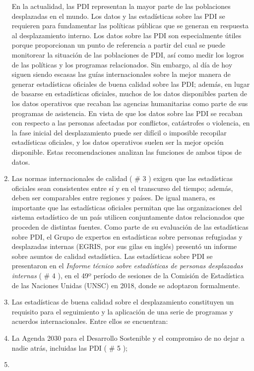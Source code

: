\documentclass[
]{book}
\begin{document}
\begin{enumerate}
  En la actualidad, las PDI representan la mayor parte de las poblaciones desplazadas en el mundo. Los datos y las estadísticas sobre las PDI se requieren para fundamentar las políticas públicas que se generan en respuesta al desplazamiento interno. Los datos sobre las PDI son especialmente útiles porque proporcionan un punto de referencia a partir del cual se puede monitorear la situación de las poblaciones de PDI, así como medir los logros de las políticas y los programas relacionados. Sin embargo, al día de hoy siguen siendo escasas las guías internacionales sobre la mejor manera de generar estadísticas oficiales de buena calidad sobre las PDI; además, en lugar de basarse en estadísticas oficiales, muchos de los datos disponibles parten de los datos operativos que recaban las agencias humanitarias como parte de sus programas de asistencia. En vista de que los datos sobre las PDI se recaban con respecto a las personas afectadas por conflictos, catástrofes o violencia, en la fase inicial del desplazamiento puede ser difícil o imposible recopilar estadísticas oficiales, y los datos operativos suelen ser la mejor opción disponible. Estas recomendaciones analizan las funciones de ambos tipos de datos.
\item
  Las normas internacionales de calidad (
  \# 3
  ) exigen que las estadísticas oficiales sean consistentes entre sí y en el transcurso del tiempo; además, deben ser comparables entre regiones y países. De igual manera, es importante que las estadísticas oficiales permitan que las organizaciones del sistema estadístico de un país utilicen conjuntamente datos relacionados que proceden de distintas fuentes. Como parte de su evaluación de las estadísticas sobre PDI, el Grupo de expertos en estadísticas sobre personas refugiadas y desplazadas internas (EGRIS, por sus gilas en inglés) presentó un informe sobre asuntos de calidad estadística. Las estadísticas sobre PDI se presentaron en el \emph{Informe técnico sobre estadísticas de personas desplazadas internas} (
  \# 4
  ), en el 49º período de sesiones de la Comisión de Estadística de las Naciones Unidas (UNSC) en 2018, donde se adoptaron formalmente.
\item
  Las estadísticas de buena calidad sobre el desplazamiento constituyen un requisito para el seguimiento y la aplicación de una serie de programas y acuerdos internacionales. Entre ellos se encuentran:
\item
  La Agenda 2030 para el Desarrollo Sostenible y el compromiso de no dejar a nadie atrás, incluidas las PDI (
  \# 5
  );
\item

\end{enumerate}
\end{document}
